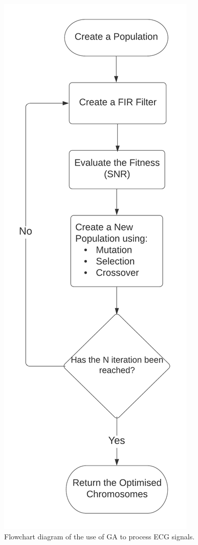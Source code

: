 \documentclass[a4paper, 11pt]{article}
\begin{document}
    \begin{figure}[h!]
        \centering
        \graphicspath{{./wiki/}}
        \includegraphics[scale=0.8]{Flowchart.png}
        \caption{Flowchart diagram of the use of GA to process ECG signals.}
        \label{Fig:method_1}
    \end{figure}
\end{document}
